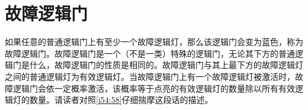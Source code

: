 \section{故障逻辑门}

如果任意的普通逻辑门上有至少一个故障逻辑灯，那么该逻辑门会变为蓝色，称为故障逻辑门。故障逻辑门是一个（不是一类）特殊的逻辑门，无论其下方的普通逻辑门是什么，故障逻辑门的性质是相同的。故障逻辑门与其上最下方的故障逻辑灯之间的普通逻辑灯为有效逻辑灯。当故障逻辑门上有一个故障逻辑灯被激活时，故障逻辑门会依一定概率激活，该概率等于点亮的有效逻辑灯的数量除以所有有效逻辑灯的数量。请读者对照\autoref{i54:58}仔细揣摩这段话的描述。

\begin{figure}[!ht]
\begin{center}
\end{center}
\end{figure}
